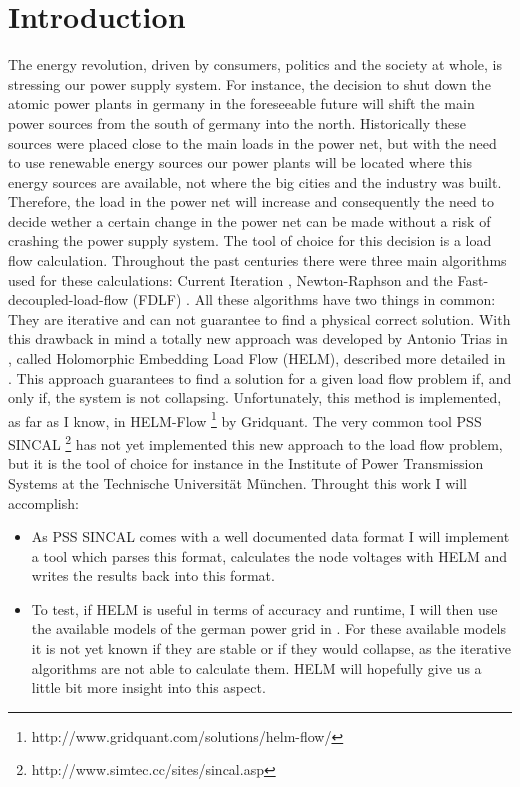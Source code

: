 \chapter{Introduction}
The energy revolution, driven by consumers, politics and the society at whole, is stressing our power supply system. For instance, the decision to shut down the atomic power plants in germany in the foreseeable future will shift the main power sources from the south of germany into the north. Historically these sources were placed close to the main loads in the power net, but with the need to use renewable energy sources our power plants will be located where this energy sources are available, not where the big cities and the industry was built. Therefore, the load in the power net will increase and consequently the need to decide wether a certain change in the power net can be made without a risk of crashing the power supply system.
The tool of choice for this decision is a load flow calculation. Throughout the past centuries there were three main algorithms used for these calculations: Current Iteration , Newton-Raphson  and the Fast-decoupled-load-flow (FDLF) . All these algorithms have two things in common: They are iterative and can not guarantee to find a physical correct solution. With this drawback in mind a totally new approach was developed by Antonio Trias in \citep{helmIEEE}, called Holomorphic Embedding Load Flow (HELM), described more detailed in . This approach guarantees to find a solution for a given load flow problem if, and only if, the system is not collapsing. Unfortunately, this method is implemented, as far as I know, in HELM-Flow \footnote{http://www.gridquant.com/solutions/helm-flow/} by Gridquant. The very common tool PSS SINCAL \footnote{http://www.simtec.cc/sites/sincal.asp} has not yet implemented this new approach to the load flow problem, but it is the tool of choice for instance in the Institute of Power Transmission Systems at the Technische Universität München. Throught this work I will accomplish:
\begin{itemize}
	\item As PSS SINCAL comes with a well documented data format I will implement a tool which parses this format, calculates the node voltages with HELM and writes the results back into this format. 
	\item To test, if HELM is useful in terms of accuracy and runtime, I will then use the available models of the german power grid in . For these available models it is not yet known if they are stable or if they would collapse, as the iterative algorithms are not able to calculate them. HELM will hopefully give us a little bit more insight into this aspect.
\end{itemize}